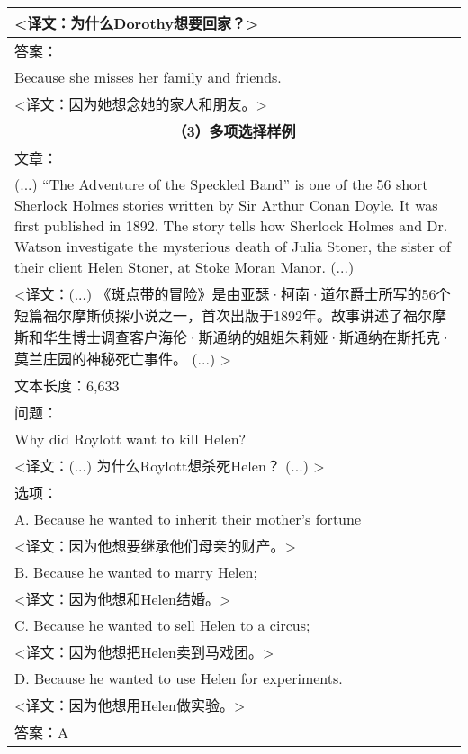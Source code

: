 \begin{table}[htbp]
\begin{tabular}{p{408pt}}
        <译文：为什么Dorothy想要回家？> \\
        \hline
        答案：\\
        Because she misses her family and friends.  \\
        <译文：因为她想念她的家人和朋友。> \\
        \hline
        \multicolumn{1}{c}{\bfseries （3）多项选择样例} \\
        \hline
        文章：\\
        (...) ``The Adventure of the Speckled Band'' is one of the 56 short Sherlock Holmes stories written by Sir Arthur Conan Doyle. It was first published in 1892. The story tells how Sherlock Holmes and Dr. Watson investigate the mysterious death of Julia Stoner, the sister of their client Helen Stoner, at Stoke Moran Manor. (...) \\
        <译文：(...) 《斑点带的冒险》是由亚瑟·柯南·道尔爵士所写的56个短篇福尔摩斯侦探小说之一，首次出版于1892年。故事讲述了福尔摩斯和华生博士调查客户海伦·斯通纳的姐姐朱莉娅·斯通纳在斯托克·莫兰庄园的神秘死亡事件。 (...) > \\
        \hline
        文本长度：6,633 \\
        \hline
        问题： \\
        Why did Roylott want to kill Helen?  \\
        <译文：(...) 为什么Roylott想杀死Helen？ (...) > \\
        \hline
        选项：\\
        A. Because he wanted to inherit their mother’s fortune \\ 
        <译文：因为他想要继承他们母亲的财产。> \\
        B. Because he wanted to marry Helen; \\
        <译文：因为他想和Helen结婚。> \\
        C. Because he wanted to sell Helen to a circus; \\
        <译文：因为他想把Helen卖到马戏团。> \\
        D. Because he wanted to use Helen for experiments. \\
        <译文：因为他想用Helen做实验。> \\
        \hline
        答案：A \\
        \hline
    \end{tabular}
    \label{tab:2-1}
\end{table}

